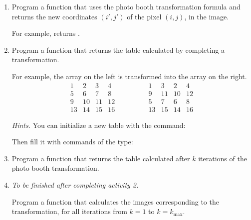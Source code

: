 \documentclass[11pt,class=report,crop=false]{standalone}
\begin{document}
\begin{activite}




\begin{enumerate}
  \item Program a  function that uses the photo booth transformation formula and returns the new coordinates $(i',j')$ of the pixel  $(i,j)$, in the image.
  
  For example,  returns .
  
  \item Program a  function that returns the table calculated by completing a transformation.

For example, the array on the left is transformed into the array on the right.
$$\begin{array}{cccc} 
  1& 2& 3& 4\\ 
  5& 6& 7& 8\\  
  9&10&11&12\\  
 13&14&15&16  
\end{array}\qquad\qquad
\begin{array}{cccc} 
  1& 3& 2& 4\\  
  9&11&10&12\\  
  5& 7& 6& 8\\  
 13&15&14&16
\end{array}$$

  \emph{Hints.} You can initialize a new table with the command:  
  
  Then fill it with commands of the type: 

  \item Program a  function that returns the table calculated after $k$ iterations of the photo booth transformation.
  
  \item \emph{To be finished after completing activity 2.}
  
  Program a  function that calculates the images corresponding to the transformation, for all iterations from $k=1$ to $k=k_{\max}$.
  

\end{enumerate}
\end{activite}
\end{document}
